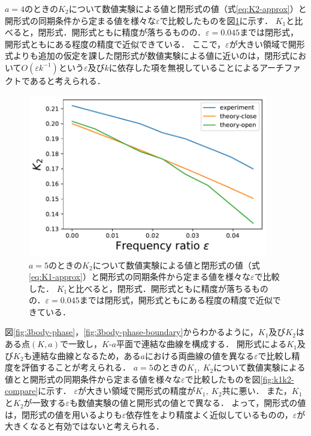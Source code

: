 \documentclass[../main]{subfiles}
\begin{document}
$a=4$のときの$K_2$について数値実験による値と閉形式の値（式\eqref{eq:K2-approx}）と開形式の同期条件から定まる値を様々な$\varepsilon$で比較したものを図\ref{fig:k2-compare}に示す．
$K_1$と比べると，閉形式．開形式ともに精度が落ちるものの．$\varepsilon=0.045$までは閉形式，開形式ともにある程度の精度で近似できている．
ここで，$\varepsilon$が大きい領域で開形式よりも追加の仮定を課した閉形式が数値実験による値に近いのは，閉形式において$O(\varepsilon k^{-1})$という$\varepsilon$及び$k$に依存した項を無視していることによるアーチファクトであると考えられる．

\begin{figure}[tbp]
\centering
\includegraphics[width=105mm]{./images/k2-compare.pdf}
\centering
\caption{$a=5$のときの$K_2$について数値実験による値と閉形式の値（式\eqref{eq:K1-approx}）と開形式の同期条件から定まる値を様々な$\varepsilon$で比較した．
$K_1$と比べると，閉形式．開形式ともに精度が落ちるものの．$\varepsilon=0.045$までは閉形式，開形式ともにある程度の精度で近似できている．}
\label{fig:k2-compare}
\end{figure}

図\ref{fig:3body-phase}，\ref{fig:3body-phase-boundary}からわかるように，$K_1$及び$K_2$はある点$(K,a)$で一致し，$K$-$a$平面で連結な曲線を構成する．
開形式による$K_1$及び$K_2$も連結な曲線となるため，ある$a$における両曲線の値を異なる$\varepsilon$で比較し精度を評価することが考えられる．
$a=5$のときの$K_1,\ K_2$について数値実験による値とと開形式の同期条件から定まる値を様々な$\varepsilon$で比較したものを図\ref{fig:k1k2-compare}に示す．
$\varepsilon$が大きい領域で開形式の精度が$K_1,\ K_2$共に悪い．
また，$K_1$と$K_2$が一致する$\varepsilon$も数値実験の値と開形式の値とで異なる．
よって，開形式の値は，閉形式の値を用いるよりも$\varepsilon$依存性をより精度よく近似しているものの，$\varepsilon$が大きくなると有効ではないと考えられる．
\end{document}
